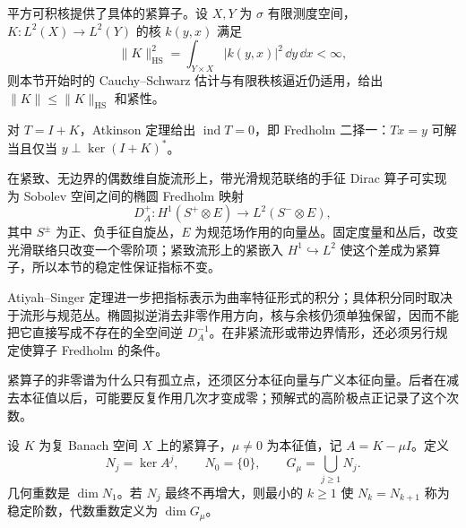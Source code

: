 平方可积核提供了具体的紧算子。设 $X,Y$ 为 $\sigma$ 有限测度空间，$K:L^2(X)\to L^2(Y)$ 的核 $k(y,x)$ 满足
\[
\|K\|_{\mathrm{HS}}^2=\int_{Y\times X}|k(y,x)|^2\,\dd y\,\dd x<\infty,
\]
则本节开始时的 Cauchy--Schwarz 估计与有限秩核逼近仍适用，给出 $\|K\|\le\|K\|_{\mathrm{HS}}$ 和紧性。

对 $T=I+K$，Atkinson 定理给出 $\operatorname{ind}T=0$，即 Fredholm 二择一：$Tx=y$ 可解当且仅当 $y\perp\ker(I+K)^*$。

在紧致、无边界的偶数维自旋流形上，带光滑规范联络的手征 Dirac 算子可实现为 Sobolev 空间之间的椭圆 Fredholm 映射
\[
D_A^+:H^1(S^+\otimes E)\longrightarrow L^2(S^-\otimes E),
\]
其中 $S^\pm$ 为正、负手征自旋丛，$E$ 为规范场作用的向量丛。固定度量和丛后，改变光滑联络只改变一个零阶项；紧致流形上的紧嵌入 $H^1\hookrightarrow L^2$ 使这个差成为紧算子，所以本节的稳定性保证指标不变。

Atiyah--Singer 定理进一步把指标表示为曲率特征形式的积分；具体积分同时取决于流形与规范丛。椭圆拟逆消去非零作用方向，核与余核仍须单独保留，因而不能把它直接写成不存在的全空间逆 $D_A^{-1}$。在非紧流形或带边界情形，还必须另行规定使算子 Fredholm 的条件。

紧算子的非零谱为什么只有孤立点，还须区分本征向量与广义本征向量。后者在减去本征值以后，可能要反复作用几次才变成零；预解式的高阶极点正记录了这个次数。

\begin{definition}[广义本征空间与重数]
设 $K$ 为复 Banach 空间 $X$ 上的紧算子，$\mu\ne0$ 为本征值，记 $A=K-\mu I$。定义
\[
N_j=\ker A^j,\qquad N_0=\{0\},
\qquad G_\mu=\bigcup_{j\ge1}N_j.
\]
几何重数是 $\dim N_1$。若 $N_j$ 最终不再增大，则最小的 $k\ge1$ 使 $N_k=N_{k+1}$ 称为稳定阶数，代数重数定义为 $\dim G_\mu$。
\end{definition}

